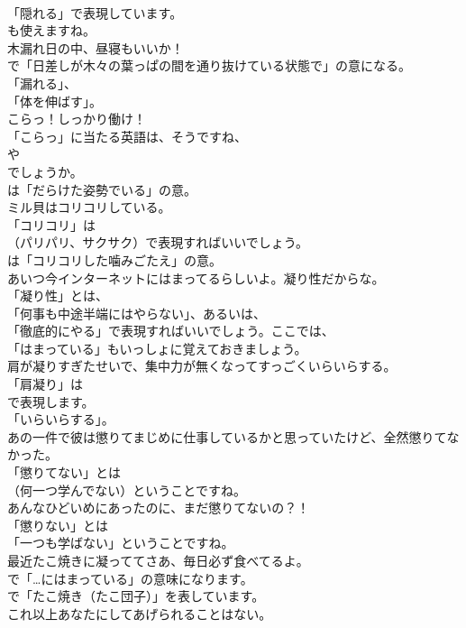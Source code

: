 \documentclass[8pt]{extreport}
\begin{document}
\begin{CJK}{UTF8}{min}
\\	「隠れる」で表現しています。
\\	も使えますね。	
\\	木漏れ日の中、昼寝もいいか！ 
\\	で「日差しが木々の葉っぱの間を通り抜けている状態で」の意になる。
\\	「漏れる」、
\\	「体を伸ばす」。	
\\	こらっ！しっかり働け！ 
\\	「こらっ」に当たる英語は、そうですね、
\\	や
\\	でしょうか。
\\	は「だらけた姿勢でいる」の意。	
\\	ミル貝はコリコリしている。 
\\	「コリコリ」は
\\	（パリパリ、サクサク）で表現すればいいでしょう。
\\	は「コリコリした噛みごたえ」の意。	
\\	あいつ今インターネットにはまってるらしいよ。凝り性だからな。 
\\	「凝り性」とは、
\\	「何事も中途半端にはやらない」、あるいは、
\\	「徹底的にやる」で表現すればいいでしょう。ここでは、
\\	「はまっている」もいっしょに覚えておきましょう。	
\\	肩が凝りすぎたせいで、集中力が無くなってすっごくいらいらする。 
\\	「肩凝り」は
\\	で表現します。
\\	「いらいらする」。	
\\	あの一件で彼は懲りてまじめに仕事しているかと思っていたけど、全然懲りてなかった。 
\\	「懲りてない」とは
\\	（何一つ学んでない）ということですね。	
\\	あんなひどいめにあったのに、まだ懲りてないの？！ 
\\	「懲りない」とは
\\	「一つも学ばない」ということですね。	
\\	最近たこ焼きに凝っててさあ、毎日必ず食べてるよ。 
\\	で「…にはまっている」の意味になります。
\\	で「たこ焼き（たこ団子）」を表しています。	
\\	これ以上あなたにしてあげられることはない。 

\end{CJK}
\end{document}
